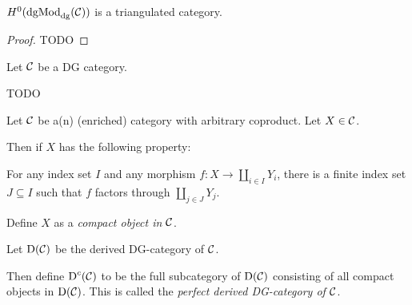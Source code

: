 \begin{theorem}
    \( H^0(\operatorname{dgMod}_{\operatorname{dg}}({\mathcal{C}})) \) is a triangulated category.
\end{theorem}
\begin{proof}
    TODO
\end{proof}


\begin{definition}
    Let \( {\mathcal{C}} \) be a DG category.

    TODO
\end{definition}


\begin{definition}
    Let \( {\mathcal{C}} \) be a(n) (enriched) category with arbitrary coproduct. Let \( X \in {\mathcal{C}} \). 
    
    Then if \( X \) has the following property:
    
    For any index set \( I \) and any morphism \( f: X \to \coprod_{i \in I} Y_i \), there is a finite index set \( J \subseteq I \) such that \( f \) factors through \( \coprod_{j \in J} Y_j \).
    
    Define \( X \) as a \emph{compact object in \( {\mathcal{C}} \)}.
\end{definition}

\begin{definition}
    Let \( \operatorname{D}({\mathcal{C}}) \) be the derived DG-category of \( {\mathcal{C}} \).

    Then define \( \operatorname{D}^c({\mathcal{C}}) \) to be the full subcategory of \( \operatorname{D}({\mathcal{C}}) \) consisting of all compact objects in \( \operatorname{D}({\mathcal{C}}) \). This is called the \emph{perfect derived DG-category of \( {\mathcal{C}} \)}.
\end{definition}

